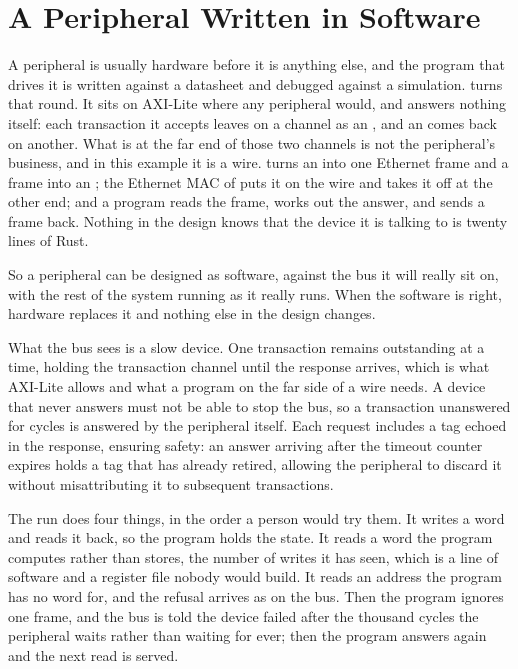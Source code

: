 \section{A Peripheral Written in Software}
\label{sec:x-remote}

A peripheral is usually hardware before it is anything else, and the
program that drives it is written against a datasheet and debugged
against a simulation.  turns that round. It sits on
AXI-Lite where any peripheral would, and answers nothing itself: each
transaction it accepts leaves on a channel as an , and an
 comes back on another. What is at the far end of those
two channels is not the peripheral's business, and in this example
it is a wire.  turns an  into one Ethernet
frame and a frame into an ; the Ethernet MAC of
 puts it on the wire and takes it off at the other
end; and a program reads the frame, works out the answer, and
sends a frame back. Nothing in the design knows that the device it
is talking to is twenty lines of Rust.

So a peripheral can be designed as software, against the bus it will
really sit on, with the rest of the system running as it really runs.
When the software is right, hardware replaces it and nothing else in
the design changes.

What the bus sees is a slow device. One transaction remains
outstanding at a time, holding the transaction channel until the
response arrives, which is what AXI-Lite allows and what a program on the
far side of a wire needs. A device that never answers must not be able to
stop the bus, so a transaction unanswered for  cycles is
answered  by the peripheral itself. Each request includes
a tag echoed in the response, ensuring safety: an answer arriving after
the timeout counter expires holds a tag that has already retired, allowing
the peripheral to discard it without misattributing it to subsequent
transactions.

The run does four things, in the order a person would try them. It
writes a word and reads it back, so the program holds the state. It
reads a word the program computes rather than stores, the number of
writes it has seen, which is a line of software and a register file
nobody would build. It reads an address the program has no word for,
and the refusal arrives as  on the bus. Then the program
ignores one frame, and the bus is told the device failed after the
thousand cycles the peripheral waits rather than waiting for ever;
then the program answers again and the next read is served.

